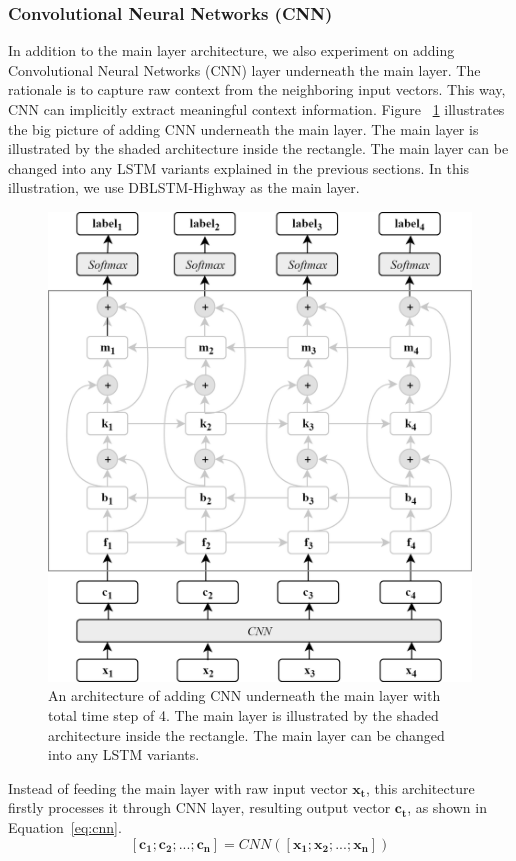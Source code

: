 \subsubsection{Convolutional Neural Networks (CNN)}
In addition to the main layer architecture, we also experiment on adding Convolutional Neural Networks (CNN) layer underneath the main layer. The rationale is to capture raw context from the neighboring input vectors. This way, CNN can implicitly extract meaningful context information. Figure ~\ref{fig:cnndblstmhighway} illustrates the big picture of adding CNN underneath the main layer. The main layer is illustrated by the shaded architecture inside the rectangle. The main layer can be changed into any LSTM variants explained in the previous sections. In this illustration, we use DBLSTM-Highway as the main layer.

\begin{figure}
	\centering
	\includegraphics[width=0.75\linewidth]{images/cnndblstmhighway}
	\caption{An architecture of adding CNN underneath the main layer with total time step of 4. The main layer is illustrated by the shaded architecture inside the rectangle. The main layer can be changed into any LSTM variants.}
	\label{fig:cnndblstmhighway}
\end{figure}

Instead of feeding the main layer with raw input vector $\mathbf{x_{t}}$, this architecture firstly processes it through CNN layer, resulting output vector $\mathbf{c_{t}}$, as shown in Equation~\ref{eq:cnn}.
\begin{equation}
\label{eq:cnn}
[\mathbf{c_{1}}; \mathbf{c_{2}}; ...; \mathbf{c_{n}}] = CNN([\mathbf{x_{1}}; \mathbf{x_{2}}; ...; \mathbf{x_{n}}])
\end{equation}

